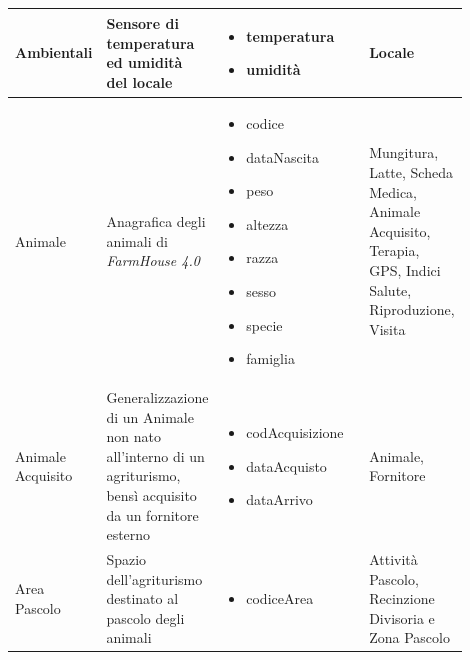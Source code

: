 \documentclass[12pt,a4paper]{article}
\begin{document}
\begin{center}
\begin{longtable}{|p{0.14\linewidth}|p{0.20\linewidth}|p{0.36\linewidth}|p{0.20\linewidth}|}
\hline
Ambientali 			&  Sensore di temperatura ed umidità del locale  
					& \begin{itemize}
						\setlength{\itemindent}{-1em}
						\vspace{-25pt}
						\setlength\itemsep{-0.25em}
						\item temperatura
						\item umidità
					\end{itemize}
					&  Locale \\

\hline
Animale 				&  Anagrafica degli animali di \textit{FarmHouse 4.0} 
					& \begin{itemize}
						\setlength{\itemindent}{-1em}
						\vspace{-25pt}
						\setlength\itemsep{-0.25em}
						\item codice
						\item dataNascita
						\item peso
						\item altezza
						\item razza
						\item sesso
						\item specie
						\item famiglia
						
					\end{itemize}
					&  Mungitura, Latte, Scheda Medica, Animale Acquisito, Terapia, GPS, Indici Salute, Riproduzione, Visita \\ 

\hline
Animale Acquisito 	& Generalizzazio\-ne di un Animale non nato all'interno di un agriturismo, bensì acquisito da un fornitore esterno
					& \begin{itemize}
						\setlength{\itemindent}{-1em}
						\vspace{-25pt}
						\setlength\itemsep{-0.25em}
						\item codAcquisizione
						\item dataAcquisto
						\item dataArrivo
						
					\end{itemize}
					&  Animale, Fornitore  \\ 

\hline
Area Pa\-sco\-lo 		&  Spazio dell'agriturismo destinato al pascolo degli animali 
					& \begin{itemize}
						\setlength{\itemindent}{-1em}
						\vspace{-25pt}
						\setlength\itemsep{-0.25em}
						\item codiceArea
					\end{itemize}
					&  Attività Pascolo, Recinzione Divisoria e Zona Pascolo \\


\end{longtable}
\end{center}
\end{document}
